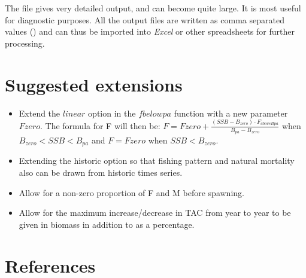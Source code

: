 \documentclass[12pt,twoside,a4paper]{article}
\begin{document}
The file  gives very detailed output, and can become quite
large. It is most useful for diagnostic purposes.  All the output
files are written as comma separated values () and can thus be
imported into \emph{Excel} or other spreadsheets for further processing.

\section{Suggested extensions}
\label{extensions}

\begin{itemize}


\item Extend the $linear$ option in the $fbelowpa$ function with a new parameter $Fzero$.
The formula for F will then be: 
$F=Fzero+\frac{(SSB-B_{zero})\cdot F_{aboveBpa}}{B_{pa}-B_{zero}}$ 
when $B_{zero} < SSB<B_{pa}$ and $F=Fzero$ when $SSB<B_{zero}$.


\item Extending the historic option so that fishing pattern and natural mortality also can be drawn 
from historic times series.

\item Allow for a non-zero proportion of F and M before spawning.

\item Allow for the maximum increase/decrease in TAC from year to year to be given in biomass in addition to
as a percentage.

\end{itemize}

\section{References}

\newenvironment{mybib}{\setlength{\parindent}{0in}\setlength{\parskip}{2ex}}{}
\end{document}
